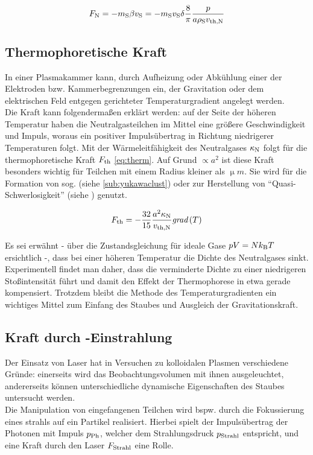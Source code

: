       \begin{align}
        F_\text{N}=-m_\text{S}\beta v_\text{S}=-m_\text{S}v_\text{S}\delta\frac{8}{\pi}\frac{p}{a\rho_\text{S}v_\text{th,N}}
      \end{align}

  \subsection{Thermophoretische Kraft}\label{subsub:therm}

    In einer Plasmakammer kann, durch Aufheizung oder Abkühlung einer der Elektroden bzw. Kammerbegrenzungen ein, der Gravitation oder dem elektrischen Feld entgegen gerichteter Temperaturgradient angelegt werden.\\
    Die Kraft kann folgendermaßen erklärt werden: auf der Seite der höheren Temperatur haben die Neutralgasteilchen im Mittel eine größere Geschwindigkeit und Impuls, woraus ein positiver Impulsübertrag in Richtung niedrigerer Temperaturen folgt.	Mit der Wärmeleitfähigkeit des Neutralgases $\kappa_\text{N}$ folgt für die thermophoretische Kraft $F_\text{th}$ \autoref{eq:therm}. Auf Grund $\propto a^2$ ist diese Kraft besonders wichtig für Teilchen mit einem Radius kleiner als $\unit{\upmu m}$. Sie wird für die Formation von sog.  (siehe \ref{sub:yukawaclust}) oder zur Herstellung von "`Quasi-Schwerlosigkeit"' (siehe \cite{Rothermel02}) genutzt.

      \begin{align}
        F_\text{th}=-\frac{32}{15}\frac{a^2 \kappa_\text{N}}{v_\text{th,N}}\textit{grad}\left(T\right) \label{eq:therm}
      \end{align}

    Es sei erwähnt -  über die Zustandsgleichung für ideale Gase $pV=Nk_\text{B}T$ ersichtlich -, dass bei einer höheren Temperatur die Dichte des Neutralgases sinkt. Experimentell findet man daher, dass die verminderte Dichte zu einer niedrigeren Stoßintensität führt und damit den Effekt der Thermophorese in etwa gerade kompensiert. Trotzdem bleibt die Methode des Temperaturgradienten ein wichtiges Mittel zum Einfang des Staubes und Ausgleich der Gravitationskraft.

  \subsection{Kraft durch -Einstrahlung}\label{subsub:laser}

    Der Einsatz von Laser hat in Versuchen zu kolloidalen Plasmen verschiedene Gründe: einerseits wird das Beobachtungsvolumen mit ihnen ausgeleuchtet, andererseits können unterschiedliche dynamische Eigenschaften des Staubes untersucht werden.\\
    Die Manipulation von eingefangenen Teilchen wird bspw. durch die Fokussierung eines strahls auf ein Partikel realisiert. Hierbei spielt der Impulsübertrag der Photonen mit Impuls $p_\text{Ph}$, welcher dem Strahlungsdruck $p_\text{Strahl}$ entspricht, und eine Kraft durch den Laser $F_\text{Strahl}$ \cite{Ashkin70} eine Rolle.


